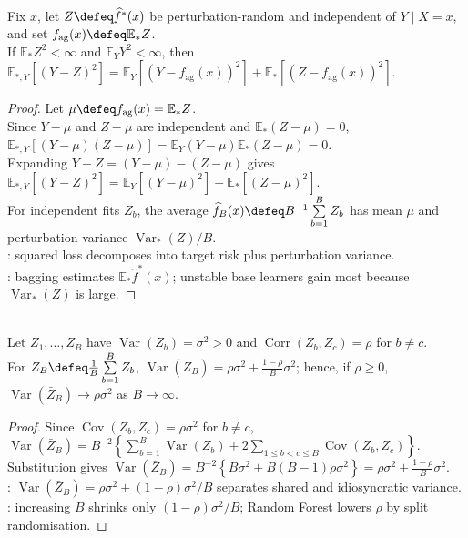 \begin{theorem} \label{thm:sl-bagging-squared-error-aggregation} \\
Fix $x$, let $Z\defeq\widehat{f}^{\ast}(x)$ be perturbation-random and independent of $Y\mid X=x$, and set $f_{\mathrm{ag}}(x)\defeq\mathbb{E}_{\ast}Z$.\\
If $\mathbb{E}_{\ast}Z^2<\infty$ and $\mathbb{E}_Y Y^2<\infty$, then $\mathbb{E}_{\ast,Y}[(Y-Z)^2]=\mathbb{E}_Y[(Y-f_{\mathrm{ag}}(x))^2]+\mathbb{E}_{\ast}[(Z-f_{\mathrm{ag}}(x))^2]$.
\begin{proof} Let $\mu\defeq f_{\mathrm{ag}}(x)=\mathbb{E}_{\ast}Z$.\\
Since $Y-\mu$ and $Z-\mu$ are independent and $\mathbb{E}_{\ast}(Z-\mu)=0$, $\mathbb{E}_{\ast,Y}[(Y-\mu)(Z-\mu)]=\mathbb{E}_Y(Y-\mu)\mathbb{E}_{\ast}(Z-\mu)=0$.\\
Expanding $Y-Z=(Y-\mu)-(Z-\mu)$ gives $\mathbb{E}_{\ast,Y}[(Y-Z)^2]=\mathbb{E}_Y[(Y-\mu)^2]+\mathbb{E}_{\ast}[(Z-\mu)^2]$.\\
For independent fits $Z_b$, the average $\widehat{f}_B(x)\defeq B^{-1}\sum\limits_{b=1}^B Z_b$ has mean $\mu$ and perturbation variance $\operatorname{Var}_{\ast}(Z)/B$.\\
: squared loss decomposes into target risk plus perturbation variance.\\
: bagging estimates $\mathbb{E}_{\ast}\widehat{f}^{\ast}(x)$; unstable base learners gain most because $\operatorname{Var}_{\ast}(Z)$ is large.
\end{proof}
\end{theorem}


\begin{theorem} \label{thm:sl-correlated-ensemble-variance} \\
Let $Z_1,\ldots,Z_B$ have $\operatorname{Var}(Z_b)=\sigma^2>0$ and $\operatorname{Corr}(Z_b,Z_c)=\rho$ for $b\neq c$.\\
For $\bar{Z}_B\defeq \frac{1}{B}\sum\limits_{b=1}^B Z_b$, $\operatorname{Var}(\bar{Z}_B)=\rho\sigma^2+\frac{1-\rho}{B}\sigma^2$; hence, if $\rho\geq0$, $\operatorname{Var}(\bar{Z}_B)\to\rho\sigma^2$ as $B\to\infty$.
\begin{proof}
Since $\operatorname{Cov}(Z_b,Z_c)=\rho\sigma^2$ for $b\neq c$, $\operatorname{Var}(\bar{Z}_B)=B^{-2}\left\{\sum\limits_{b=1}^B\operatorname{Var}(Z_b)+2\sum\limits_{1\leq b<c\leq B}\operatorname{Cov}(Z_b,Z_c)\right\}$.\\
Substitution gives $\operatorname{Var}(\bar{Z}_B)=B^{-2}\left\{B\sigma^2+B(B-1)\rho\sigma^2\right\}=\rho\sigma^2+\frac{1-\rho}{B}\sigma^2$.\\
: $\operatorname{Var}(\bar{Z}_B)=\rho\sigma^2+(1-\rho)\sigma^2/B$ separates shared and idiosyncratic variance.\\
: increasing $B$ shrinks only $(1-\rho)\sigma^2/B$; Random Forest lowers $\rho$ by split randomisation.
\end{proof}
\end{theorem}

